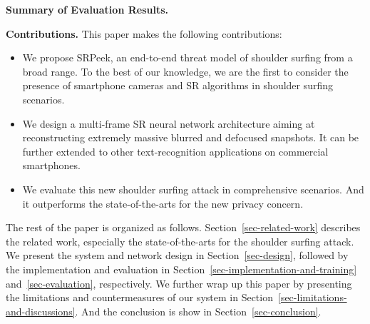 
\vspace{1mm}
\noindent
\textbf{Summary of Evaluation Results.}


\vspace{1mm}
\noindent
\textbf{Contributions.} This paper makes the following contributions:
\begin{itemize}[leftmargin=*]
  \item	We propose \textsf{SRPeek}, an end-to-end threat model of shoulder surfing from a broad range. To the best of our knowledge, we are the first to consider the presence of smartphone cameras and SR algorithms in shoulder surfing scenarios.
  \item	We design a multi-frame SR neural network architecture aiming at reconstructing extremely massive blurred and defocused snapshots. It can be further extended to other text-recognition applications on commercial smartphones.
  \item	We evaluate this new shoulder surfing attack in comprehensive scenarios. And it outperforms the state-of-the-arts for the new privacy concern.
\end{itemize}
The rest of the paper is organized as follows. Section~\ref{sec-related-work} describes the related work, especially the state-of-the-arts for the shoulder surfing attack. We present the system and network design in Section~\ref{sec-design}, followed by the implementation and evaluation in Section~\ref{sec-implementation-and-training} and~\ref{sec-evaluation}, respectively. We further wrap up this paper by presenting the limitations and countermeasures of our system in Section~\ref{sec-limitations-and-discussions}. And the conclusion is show in Section~\ref{sec-conclusion}.
